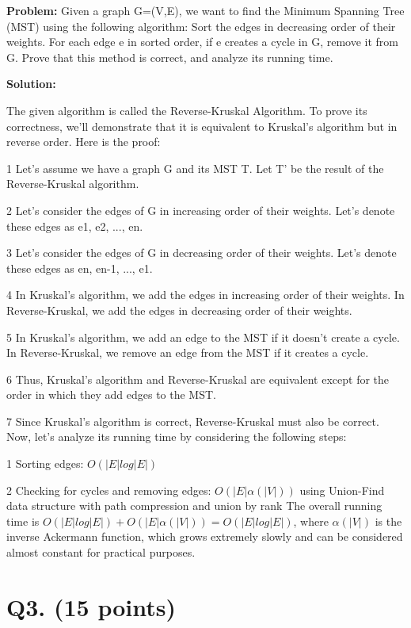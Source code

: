 \documentclass[11pt]{article}
\begin{document}
    \textbf{Problem:} Given a graph G=(V,E), we want to find the Minimum Spanning Tree (MST) using the following algorithm: Sort the edges in decreasing order of their weights. For each edge e in sorted order, if e creates a cycle in G, remove it from G. Prove that this method is correct, and analyze its running time.

    \textbf{Solution:}

    The given algorithm is called the Reverse-Kruskal Algorithm. To prove its correctness, we'll demonstrate that it is equivalent to Kruskal's algorithm but in reverse order. Here is the proof:

    \itemize
    \item[1] Let's assume we have a graph G and its MST T. Let T' be the result of the Reverse-Kruskal algorithm.
    \item[2] Let's consider the edges of G in increasing order of their weights. Let's denote these edges as e1, e2, ..., en.
    \item[3] Let's consider the edges of G in decreasing order of their weights. Let's denote these edges as en, en-1, ..., e1.
    \item[4] In Kruskal's algorithm, we add the edges in increasing order of their weights. In Reverse-Kruskal, we add the edges in decreasing order of their weights.
    \item[5] In Kruskal's algorithm, we add an edge to the MST if it doesn't create a cycle. In Reverse-Kruskal, we remove an edge from the MST if it creates a cycle.
    \item[6] Thus, Kruskal's algorithm and Reverse-Kruskal are equivalent except for the order in which they add edges to the MST.
    \item[7] Since Kruskal's algorithm is correct, Reverse-Kruskal must also be correct.
    \enditemize
    Now, let's analyze its running time by considering the following steps:

    \itemize
    \item[1]Sorting edges: $O(|E| log |E|)$
    \item[2]Checking for cycles and removing edges: $O(|E| \alpha(|V|))$ using Union-Find data structure with path compression and union by rank
    \enditemize
    The overall running time is $O(|E| log |E|) + O(|E| \alpha(|V|)) = O(|E| log |E|)$, where $\alpha(|V|)$ is the inverse Ackermann function, which grows extremely slowly and can be considered almost constant for practical purposes.


    \section{Q3. (15 points)}
\end{document}
